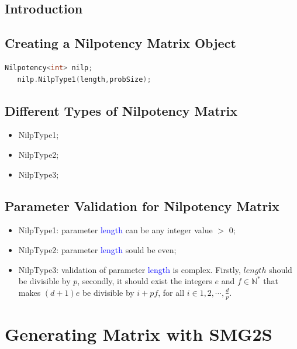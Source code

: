 \documentclass[a4paper, 10 pt]{report}
\begin{document}
	\section{Introduction}
	\section{Creating a Nilpotency Matrix Object}
	
	\begin{lstlisting}[language=C++,frame=single]
   Nilpotency<int> nilp;
   nilp.NilpType1(length,probSize);
	\end{lstlisting}
	
	\section{Different Types of Nilpotency Matrix}
	
	\begin{itemize}
		\item NilpType1;
		\item NilpType2;
		\item NilpType3;
	\end{itemize}
	\section{Parameter Validation for Nilpotency Matrix}
	\begin{itemize}
	\item NilpType1: parameter \textcolor{blue}{length} can be any integer value $>$ 0;
	\item NilpType2: parameter \textcolor{blue}{length} sould be even;
	\item NilpType3: validation of parameter \textcolor{blue}{length} is complex. Firstly, $length$ should be divisible by $p$, secondly, it should exist the integers $e$ and $f\in \mathbb{N^*}$ that makes $(d+1)e$ be divisible by $i+pf$,  for all $i \in 1,2,\cdots, \frac{d}{p}$.
\end{itemize}

	\newpage

	\chapter{Generating Matrix with SMG2S}
	
\end{document}

